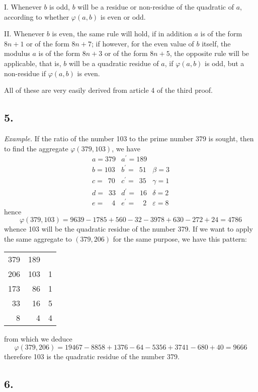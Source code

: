 \documentclass[twoside,12pt, showframe]{memoir}
\begin{document}
I. Whenever \(b\) is odd, \(b\) will be a residue or non-residue of the quadratic of \(a\), according to whether \(\varphi(a, b)\) is even or odd.
 
II. Whenever \(b\) is even, the same rule will hold, if in addition \(a\) is of the form \(8n+1\) or of the form \(8n+7\); if however, for the even value of \(b\) itself, the modulus \(a\) is of the form \(8n+3\) or of the form \(8n+5\), the opposite rule will be applicable, that is, \(b\) will be a quadratic residue of \(a\), if \(\varphi(a, b)\) is odd, but a non-residue if \(\varphi(a, b)\) is even.
 
All of these are very easily derived from article 4 of the third proof.
%

\subsection*{5.}

\textit{Example.} If the ratio of the number 103 to the prime number 379 is sought, then to find the aggregate \(\varphi(379,103)\), we have
\[\begin{array}{r|r|r}
a= 379 & a^{\prime}=189 & \\
b= 103 & b^{\prime}=\phantom{0}51 & \beta=3 \\
c= \phantom{0}70 & c^{\prime}=\phantom{0}35 & \gamma=1 \\
d= \phantom{0}33 & d^{\prime}=\phantom{0}16 & \delta=2 \\
e= \phantom{00}4 & e^{\prime}=\phantom{00}2 & \varepsilon=8
\end{array}\]
hence
\[\varphi(379,103)=9639-1785+560-32-3978+630-272+24=4786\]
whence 103 will be the quadratic residue of the number 379. If we want to apply the same aggregate to \((379,206)\) for the same purpose, we have this pattern:
\begin{center}
\begin{tabular}{r|r|r}
379 & 189 &  \\
206 & 103 & 1 \\
173 & 86 & 1 \\
33 & 16 & 5 \\
8 & 4 & 4 \\
\end{tabular}
\end{center}
from which we deduce
\[\varphi(379,206)=19467-8858+1376-64-5356+3741-680+40=9666\]
therefore 103 is the quadratic residue of the number 379.
%

\subsection*{6.}
\end{document}
